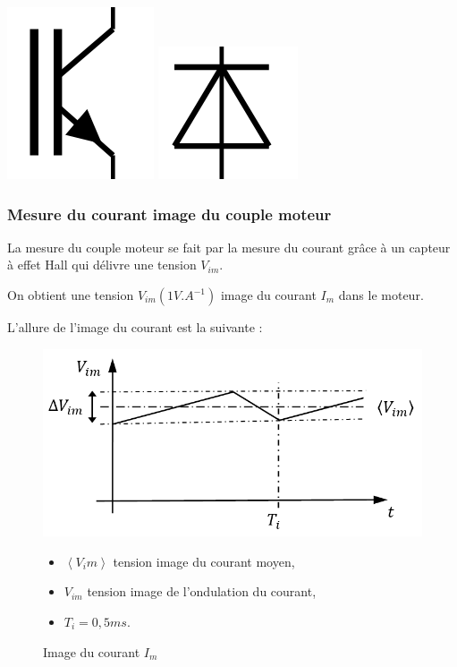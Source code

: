 \begin{center}
\includegraphics[width=0.1\linewidth]{img/transistor} \hspace{1cm} \includegraphics[width=0.1\linewidth]{img/diode} 
\end{center}

\newpage

\subsubsection{Mesure du courant image du couple moteur}

La mesure du couple moteur se fait par la mesure du courant grâce à un capteur à effet Hall qui délivre une tension $V_{im}$.

On obtient une tension $V_{im}(1V.A^{-1})$ image du courant $I_m$ dans le moteur.

L'allure de l'image du courant est la suivante :

\begin{figure}[!h]
\begin{minipage}{0.5\linewidth}
\begin{center}
	\includegraphics[width=0.9\linewidth]{img/fig17}
\end{center}
	\caption{Image du courant $I_m$}
	\label{fig17}
\end{minipage}\hfill
\begin{minipage}{0.45\linewidth}
\begin{itemize}
 \item $\left\langle  V_im\right\rangle$ tension image du courant moyen,
 \item $V_{im}$ tension image de l'ondulation du courant,
 \item $T_i=0,5ms$.
\end{itemize}
\end{minipage}
\end{figure}

